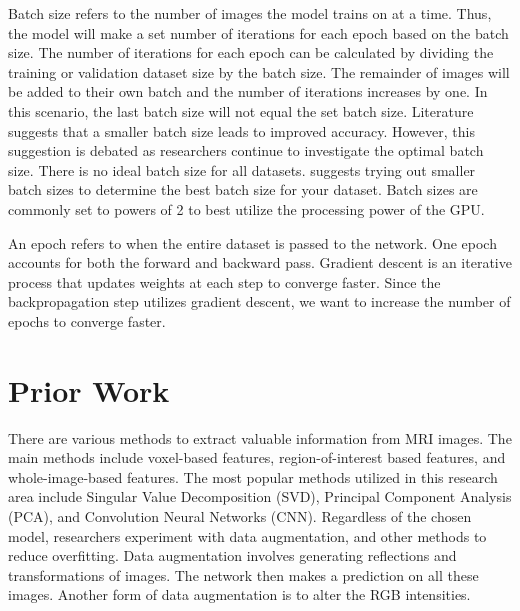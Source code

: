 \documentclass[10pt,twocolumn]{article}
\begin{document}
Batch size refers to the number of images the model trains on at a time. Thus, the model will make a set number of iterations for each epoch based on the batch size. The number of iterations for each epoch can be calculated by dividing the training or validation dataset size by the batch size. The remainder of images will be added to their own batch and the number of iterations increases by one. In this scenario, the last batch size will not equal the set batch size. Literature suggests that a smaller batch size leads to improved accuracy. However, this suggestion is debated as researchers continue to investigate the optimal batch size. There is no ideal batch size for all datasets. \cite{kandel2020effect} suggests trying out smaller batch sizes to determine the best batch size for your dataset. Batch sizes are commonly set to powers of 2 to best utilize the processing power of the GPU. 

An epoch refers to when the entire dataset is passed to the network. One epoch accounts for both the forward and backward pass. Gradient descent is an iterative process that updates weights at each step to converge faster. Since the backpropagation step utilizes gradient descent, we want to increase the number of epochs to converge faster.


\section{Prior Work}

There are various methods to extract valuable information from MRI images. The main methods include voxel-based features, region-of-interest based features, and whole-image-based features. The most popular methods utilized in this research area include Singular Value Decomposition (SVD), Principal Component Analysis (PCA), and Convolution Neural Networks (CNN). Regardless of the chosen model, researchers experiment with data augmentation, and other methods to reduce overfitting. Data augmentation involves generating reflections and transformations of images. The network then makes a prediction on all these images. Another form of data augmentation is to alter the RGB intensities.  
\end{document}
